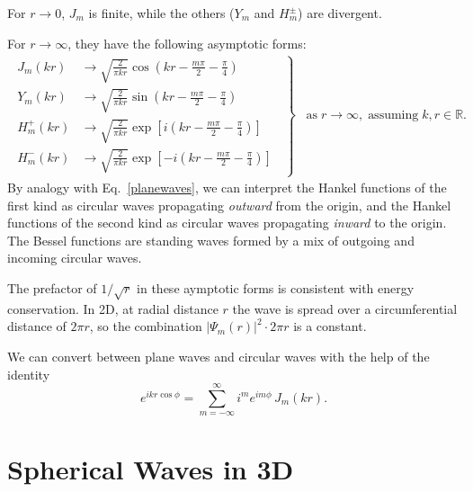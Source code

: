 \documentclass[pra,12pt]{revtex4}
\begin{document}
For $r \rightarrow 0$, $J_m$ is finite, while the others ($Y_m$ and
$H_m^\pm$) are divergent.

For $r \rightarrow \infty$, they have the following asymptotic forms:
\begin{align}
  \left.
  \begin{aligned}
    J_m(kr) &\rightarrow
    \sqrt{\frac{2}{\pi kr}} \cos\!\left(kr - \frac{m\pi}{2} - \frac{\pi}{4}\right) \\
    Y_m(kr) &\rightarrow
    \sqrt{\frac{2}{\pi kr}} \sin\!\left(kr - \frac{m\pi}{2} - \frac{\pi}{4}\right) \\
    H_m^+(kr) &\rightarrow
    \sqrt{\frac{2}{\pi kr}}
    \exp\left[i\left(kr - \frac{m\pi}{2} - \frac{\pi}{4}\right)\right] \\
    H_m^-(kr) &\rightarrow
    \sqrt{\frac{2}{\pi kr}}
    \exp\left[-i\left(kr - \frac{m\pi}{2} - \frac{\pi}{4}\right)\right]
  \end{aligned}\;\;
  \right\}
  \;\;\; \text{as}\; r \rightarrow \infty,\;
  \textrm{assuming} \;k,r\in\mathbb{R}.
  \label{Jasymptote}
\end{align}
By analogy with Eq.~\eqref{planewaves}, we can interpret the Hankel
functions of the first kind as circular waves propagating
\textit{outward} from the origin, and the Hankel functions of the
second kind as circular waves propagating \textit{inward} to the
origin.  The Bessel functions are standing waves formed by a mix of
outgoing and incoming circular waves.

The prefactor of $1/\sqrt{r}$ in these aymptotic forms is consistent
with energy conservation.  In 2D, at radial distance $r$ the wave is
spread over a circumferential distance of $2\pi r$, so the combination
$|\Psi_m(r)|^2 \cdot 2\pi r$ is a constant.

We can convert between plane waves and circular waves with the help of
the identity
\begin{equation}
  e^{ikr\cos\phi} = \sum_{m=-\infty}^\infty i^m e^{im\phi} \, J_m(kr).
\end{equation}

\section{Spherical Waves in 3D}
\label{sec:spherical}
\end{document}
